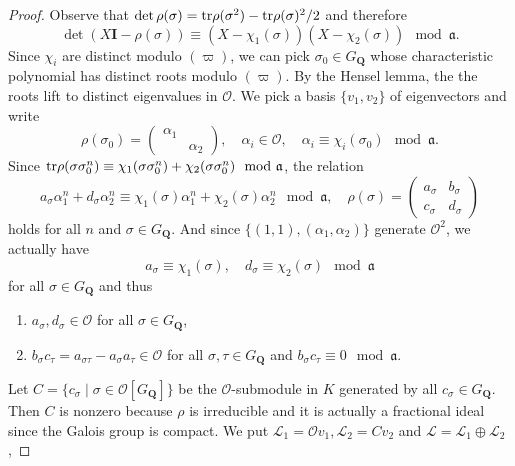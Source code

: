 \documentclass[11pt]{amsart}
\newcommand{\Q}{\mathbf{Q}}  %
\newcommand{\ir}{\mathcal{O}} %
\newcommand{\tr}{{\rm tr}} %
\newcommand{\mat}[1]{ \begin{pmatrix}
#1
\end{pmatrix} }
\theoremstyle{definition}
\theoremstyle{definition}
\theoremstyle{definition}
\theoremstyle{definition}
\theoremstyle{definition}
\theoremstyle{definition}
\begin{document}
\begin{proof}
    Observe that
    $\det\rho(\sigma)=\tr\rho(\sigma^2)-\tr\rho(\sigma)^2/2$
    and therefore
    \begin{equation*}
        \det(X\mathbf{I}-\rho(\sigma))\equiv (X-\chi_1(\sigma))(X-\chi_2(\sigma))\mod \mathfrak{a}.
    \end{equation*}
    Since $\chi_i$ are distinct modulo $(\varpi)$,
    we can pick $\sigma_0\in G_\Q$ whose characteristic polynomial 
    has distinct roots modulo $(\varpi)$.
    By the Hensel lemma, the the roots lift to distinct eigenvalues in $\ir$.
    We pick a basis $\{v_1,v_2\}$ of eigenvectors and write
    \begin{equation*}
        \rho(\sigma_0)=\mat{\alpha_1&\\&\alpha_2}, \quad
        \alpha_i\in \ir,\quad
        \alpha_i\equiv \chi_i(\sigma_0)\mod \mathfrak{a}.
    \end{equation*}
    Since $\tr\rho(\sigma\sigma_0^n)\equiv \chi_1(\sigma\sigma_0^n)+\chi_2(\sigma\sigma_0^n)\mod \mathfrak{a}$, the relation
    \begin{equation*}
        a_\sigma\alpha_1^n+d_\sigma\alpha_2^n\equiv
        \chi_1(\sigma)\alpha_1^n+\chi_2(\sigma)\alpha_2^n
        \mod \mathfrak{a},\quad
        \rho(\sigma)=\mat{a_\sigma &b_\sigma\\c_\sigma&d_\sigma}
    \end{equation*}
    holds for all $n$ and $\sigma\in G_\Q$. 
    And since $\{(1,1), (\alpha_1,\alpha_2)\}$ generate $\ir^2$, we actually have
    \begin{equation*}
        a_\sigma\equiv \chi_1(\sigma),\quad
        d_\sigma\equiv \chi_2(\sigma) \mod \mathfrak{a}
    \end{equation*}
    for all $\sigma\in G_\Q$ and thus
    \begin{enumerate}
        \item $a_\sigma, d_\sigma \in \ir$ for all $\sigma\in G_\Q$,
        \item $b_\sigma c_\tau=a_{\sigma\tau}-a_\sigma a_\tau\in \ir$
        for all $\sigma, \tau\in G_\Q$ and $b_\sigma c_\tau\equiv 0\mod \mathfrak{a}$.
    \end{enumerate}
    Let $C=\{c_\sigma\mid \sigma\in \ir[G_\Q]\}$
    be the $\ir$-submodule in $K$
    generated by all $c_\sigma\in G_\Q$. 
    Then $C$ is nonzero because  $\rho$ is irreducible and
    it is actually a fractional ideal since the Galois group is compact.
    We put $\mathcal{L}_1=\ir v_1, \mathcal{L}_2=C v_2$ and $\mathcal{L}=\mathcal{L}_1\oplus\mathcal{L}_2$,

\end{proof}
\end{document}
